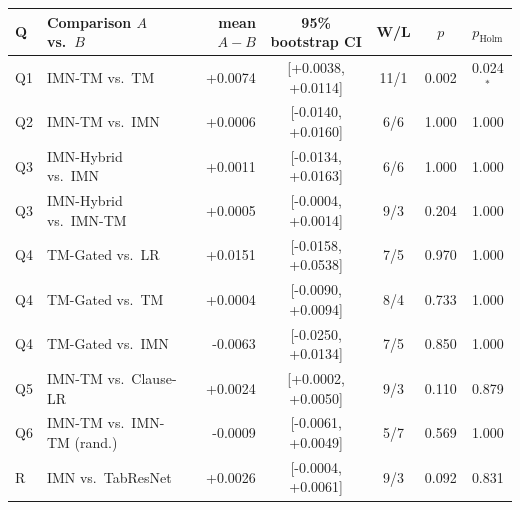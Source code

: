 \begin{tabular}{llrcccc}
\toprule
Q & Comparison $A$ vs.\ $B$ & mean $A{-}B$ & 95\% bootstrap CI & W/L & $p$ & $p_\text{Holm}$ \\
\midrule
Q1 & IMN-TM vs.\ TM & +0.0074 & [+0.0038, +0.0114] & 11/1 & 0.002 & 0.024$^\ast$ \\
Q2 & IMN-TM vs.\ IMN & +0.0006 & [-0.0140, +0.0160] & 6/6 & 1.000 & 1.000 \\
Q3 & IMN-Hybrid vs.\ IMN & +0.0011 & [-0.0134, +0.0163] & 6/6 & 1.000 & 1.000 \\
Q3 & IMN-Hybrid vs.\ IMN-TM & +0.0005 & [-0.0004, +0.0014] & 9/3 & 0.204 & 1.000 \\
Q4 & TM-Gated vs.\ LR & +0.0151 & [-0.0158, +0.0538] & 7/5 & 0.970 & 1.000 \\
Q4 & TM-Gated vs.\ TM & +0.0004 & [-0.0090, +0.0094] & 8/4 & 0.733 & 1.000 \\
Q4 & TM-Gated vs.\ IMN & -0.0063 & [-0.0250, +0.0134] & 7/5 & 0.850 & 1.000 \\
Q5 & IMN-TM vs.\ Clause-LR & +0.0024 & [+0.0002, +0.0050] & 9/3 & 0.110 & 0.879 \\
Q6 & IMN-TM vs.\ IMN-TM (rand.) & -0.0009 & [-0.0061, +0.0049] & 5/7 & 0.569 & 1.000 \\
R & IMN vs.\ TabResNet & +0.0026 & [-0.0004, +0.0061] & 9/3 & 0.092 & 0.831 \\
\bottomrule
\end{tabular}
